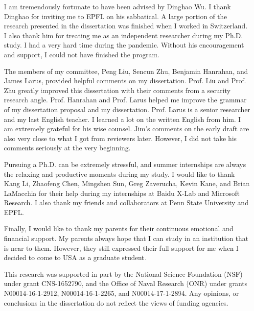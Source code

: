 I am tremendously fortunate to have been advised by Dinghao Wu.  I thank Dinghao for inviting me to EPFL on his sabbatical. A large portion of the research presented in the dissertation was finished when I worked in Switzerland. I also thank him for treating me as an independent researcher during my Ph.D. study. I had a very hard time during the pandemic. Without his encouragement and support, I could not have finished the program.

The members of my committee, Peng Liu, Sencun Zhu, Benjamin Hanrahan, and James Larus, provided helpful comments on my dissertation. Prof. Liu and Prof. Zhu greatly improved this dissertation with their comments from a security research angle. Prof. Hanrahan and Prof. Larus helped me improve the grammar of my dissertation proposal and my dissertation. Prof. Larus is a senior researcher and my last English teacher. I learned a lot on the written English from him. I am extremely grateful for his wise counsel.  Jim's comments on the early draft are also very close to what I got from reviewers later. However, I did not take his comments seriously at the very beginning.  

Pursuing a Ph.D. can be extremely stressful, and summer internships are always the relaxing and productive moments during my study. I would like to thank Kang Li, Zhaofeng Chen, Mingshen Sun, Greg Zaverucha, Kevin Kane, and Brian LaMacchia for their help during my internships at Baidu X-Lab and Microsoft Research.  I also thank my friends and collaborators at Penn State University and EPFL. 

Finally, I would like to thank my parents for their continuous emotional and financial support. My parents always hope that I can study in an institution that is near to them. However, they still expressed their full support for me when I decided to come to USA as a graduate student.

This research was supported in part by the National Science Foundation (NSF) under grant CNS-1652790, and the Office of Naval Research (ONR) under grants N00014-16-1-2912, N00014-16-1-2265, and N00014-17-1-2894. Any opinions, or conclusions in the dissertation do not reflect the views of funding agencies.

